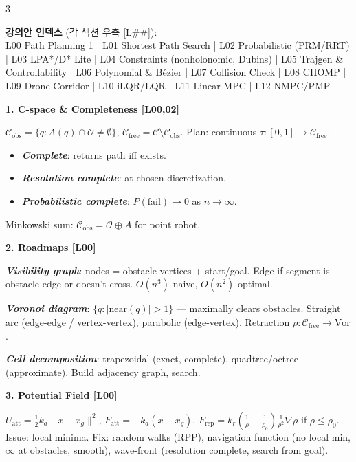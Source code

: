 \documentclass[8pt,a4paper,landscape]{extarticle}
\newcommand{\sect}[1]{\vspace{1pt}\colorbox{black!10}{\parbox{\linewidth}{\textbf{\footnotesize #1}}}\vspace{1pt}}
\newcommand{\sub}[1]{\textbf{\textit{#1}}}
\begin{document}
\begin{multicols*}{3}

\begin{tcolorbox}[colback=blue!5,colframe=blue!40,boxrule=0.3pt,arc=1pt,left=2pt,right=2pt,top=1pt,bottom=1pt]
{\scriptsize\textbf{강의안 인덱스} (각 섹션 우측 [L\#\#]):\\
L00 Path Planning 1 | L01 Shortest Path Search | L02 Probabilistic (PRM/RRT) | L03 LPA*/D* Lite | L04 Constraints (nonholonomic, Dubins) | L05 Trajgen \& Controllability | L06 Polynomial \& Bézier | L07 Collision Check | L08 CHOMP | L09 Drone Corridor | L10 iLQR/LQR | L11 Linear MPC | L12 NMPC/PMP}
\end{tcolorbox}

\sect{1. C-space \& Completeness \hfill {\scriptsize[L00,02]}}
$\mathcal{C}_{\text{obs}} = \{q : A(q)\cap\mathcal{O}\neq\emptyset\}$, $\mathcal{C}_{\text{free}}=\mathcal{C}\setminus\mathcal{C}_{\text{obs}}$. Plan: continuous $\tau:[0,1]\to\mathcal{C}_{\text{free}}$.
\begin{itemize}
\item \sub{Complete}: returns path iff exists.
\item \sub{Resolution complete}: at chosen discretization.
\item \sub{Probabilistic complete}: $P(\text{fail})\to 0$ as $n\to\infty$.
\end{itemize}
Minkowski sum: $\mathcal{C}_{\text{obs}} = \mathcal{O}\oplus A$ for point robot.

\sect{2. Roadmaps \hfill {\scriptsize[L00]}}
\sub{Visibility graph}: nodes = obstacle vertices + start/goal. Edge if segment is obstacle edge or doesn't cross. $O(n^3)$ naive, $O(n^2)$ optimal.

\sub{Voronoi diagram}: $\{q : |\text{near}(q)|>1\}$ — maximally clears obstacles. Straight arc (edge-edge / vertex-vertex), parabolic (edge-vertex). Retraction $\rho:\mathcal{C}_{\text{free}}\to\text{Vor}$.

\sub{Cell decomposition}: trapezoidal (exact, complete), quadtree/octree (approximate). Build adjacency graph, search.

\sect{3. Potential Field \hfill {\scriptsize[L00]}}
$U_{\text{att}}=\tfrac12 k_a\|x-x_g\|^2$, $F_{\text{att}}=-k_a(x-x_g)$.
$F_{\text{rep}}=k_r(\tfrac1\rho-\tfrac1{\rho_0})\tfrac1{\rho^2}\nabla\rho$ if $\rho\le\rho_0$.
Issue: local minima. Fix: random walks (RPP), navigation function (no local min, $\infty$ at obstacles, smooth), wave-front (resolution complete, search from goal).


\end{multicols*}
\end{document}
